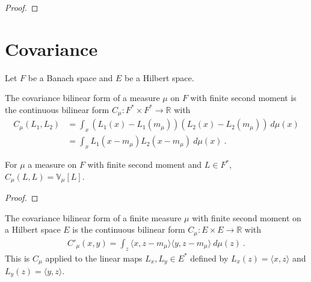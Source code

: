 \begin{proof}\leanok

\end{proof}



\section{Covariance}
\label{sec:covariance}

Let $F$ be a Banach space and $E$ be a Hilbert space.

\begin{definition}[Covariance]\label{def:covarianceBilin}
  \mathlibok
The covariance bilinear form of a measure $\mu$ on $F$ with finite second moment is the continuous bilinear form $C_\mu : F^* \times F^* \to \mathbb{R}$ with
\begin{align*}
  C_\mu(L_1, L_2)
  &= \int_x (L_1(x) - L_1(m_\mu)) (L_2(x) - L_2(m_\mu)) \: d\mu(x)
  \\
  &= \int_x L_1(x - m_\mu) L_2(x- m_\mu) \: d\mu(x)
  \: .
\end{align*}
\end{definition}

\begin{lemma}\label{lem:covarianceBilin_same_eq_variance}
  \mathlibok
For $\mu$ a measure on $F$ with finite second moment and $L \in F^*$, $C_\mu(L, L) = \mathbb{V}_\mu[L]$.
\end{lemma}

\begin{proof}\leanok

\end{proof}


\begin{definition}\label{def:covInnerBilin}
  \mathlibok
The covariance bilinear form of a finite measure $\mu$ with finite second moment on a Hilbert space $E$ is the continuous bilinear form $C_\mu : E \times E \to \mathbb{R}$ with
\begin{align*}
  C'_\mu(x, y) = \int_z \langle x, z - m_\mu \rangle \langle y, z - m_\mu \rangle \: d\mu(z) \: .
\end{align*}
This is $C_\mu$ applied to the linear maps $L_x, L_y \in E^*$ defined by $L_x(z) = \langle x, z \rangle$ and $L_y(z) = \langle y, z \rangle$.
\end{definition}


